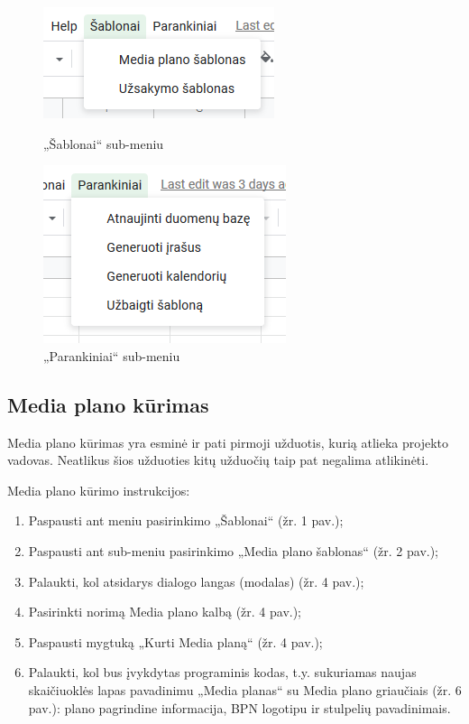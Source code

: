 \begin{figure}[h]
    \centering
    \begin{minipage}{0.45\textwidth}
        \centering
        \includegraphics[scale=0.9]{Images/Screenshots/menu-template-options.PNG} 
        \caption{„Šablonai“ sub-meniu}
    \end{minipage}\hfill
    \begin{minipage}{0.45\textwidth}
        \centering
        \includegraphics[scale=0.9]{Images/Screenshots/menu-other-options.PNG} 
        \caption{„Parankiniai“ sub-meniu}
    \end{minipage}
\end{figure}

\subsection{Media plano kūrimas}
Media plano kūrimas yra esminė ir pati pirmoji užduotis, kurią atlieka projekto vadovas. Neatlikus šios užduoties kitų užduočių taip pat negalima atlikinėti.

\bigskip
Media plano kūrimo instrukcijos: 
\begin{enumerate}
    \itemsep0em 
    \item Paspausti ant meniu pasirinkimo „Šablonai“ (žr. 1 pav.);
    \item Paspausti ant sub-meniu pasirinkimo „Media plano šablonas“ (žr. 2 pav.);
    \item Palaukti, kol atsidarys dialogo langas (modalas) (žr. 4 pav.);
    \item Pasirinkti norimą Media plano kalbą (žr. 4 pav.);
    \item Paspausti mygtuką „Kurti Media planą“ (žr. 4 pav.);
    \item Palaukti, kol bus įvykdytas programinis kodas, t.y. sukuriamas naujas skaičiuoklės lapas pavadinimu „Media planas“ su Media plano griaučiais (žr. 6 pav.): plano pagrindine informacija, BPN logotipu ir stulpelių pavadinimais. 
\end{enumerate}


